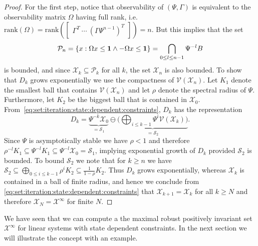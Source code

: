 \documentclass[letterpaper, 10pt, conference]{ieeeconf} %
\begin{document}
\begin{proof}
For the first step, notice that observability of
$(\Psi,\Gamma)$ is equivalent to the observability matrix $\Omega$ having full rank, i.e.\ $\mathrm{rank}(\Omega) = \mathrm{rank}(\begin{bmatrix} \Gamma^T \ \cdots \ (\Gamma\Psi^{n-1})^T\end{bmatrix}) = n$.
But  this implies that the set 
\[
\mathcal P_{n} = \{x: 
\Omega x\leq{\bf{1}}\wedge-\Omega x\leq{\bf{1}}\} = \bigcap_{0\leq l\leq n-1} \Psi^{-l} B
\]
is bounded, and since $\mathcal X_k\subseteq \mathcal P_k$ for all $k$, 
the set $\mathcal X_{n}$ is also bounded. 
To show that $D_k$ grows exponentially we use the compactness of $\mathcal V(\mathcal X_{n})$. Let $K_1$ denote the smallest ball that contains $\mathcal V(\mathcal X_{n})$ and let
$\rho$ denote the spectral radius of $\Psi$. Furthermore, let $K_2$
be the biggest ball that is contained in $\mathcal X_{0}$. From~\eqref{eq:set:iteration:state:dependent:constraints}, $D_k$ has the representation
\begin{equation}
D_k = \underbrace{\Psi^{-k}\mathcal X_0}_{=\mathcal S_1} \ominus \underbrace{\biggl(\bigoplus_{i\leq k-1} 
\Psi^i\mathcal V(\mathcal X_k)\biggr)}_{=\mathcal S_2}.
\end{equation}
Since $\Psi$ is asymptotically stable we have $\rho<1$ and therefore
$\rho^{-l}K_1\subseteq\Psi^{-l} K_1 \subseteq \Psi^{-l}\mathcal X_0 = \mathcal S_1$,
implying exponential growth of $D_k$ provided $\mathcal S_2$ is bounded. 
To bound $\mathcal S_2$ we note that for $k\geq n$ we have $\mathcal S_2\subseteq \bigoplus_{0\leq i\leq k-1} \rho^i K_2 \subseteq
\frac{1}{1-\rho} K_2$.
Thus $D_k$ grows exponentially,
whereas $\mathcal X_k$ is contained in a ball of
finite radius, and hence we conclude from \eqref{eq:set:iteration:state:dependent:constraints} that 
$\mathcal X_{k+1} = \mathcal X _k$ for all $k\geq N$ and therefore $\mathcal X _N = \mathcal X^\infty$ for finite $N$.
\end{proof}
%
We have seen that we can compute a the maximal robust positively invariant set $\mathcal X^\infty$ for linear 
systems with state dependent constraints. In the next section we will illustrate the concept with an 
example.
%
%
%
\end{document}
